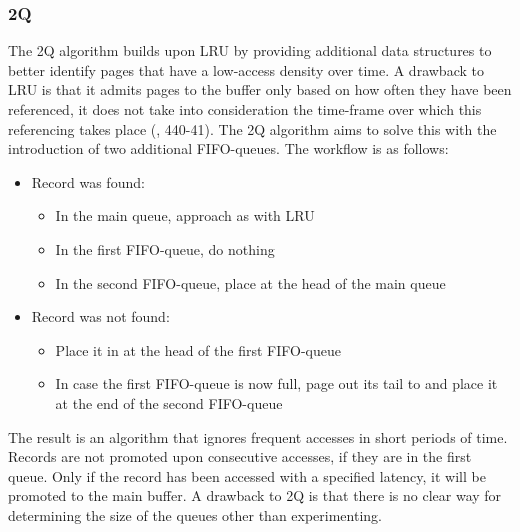 \documentclass[a4paper, twocolumn,11pt]{article}
\begin{document}
\subsubsection{2Q}
The 2Q algorithm builds upon LRU by providing additional data structures to better identify pages that have a low-access density over time. A drawback to LRU is that it admits pages to the buffer only based on how often they have been referenced, it does not take into consideration the time-frame over which this referencing takes place (\cite{Johnson}, 440-41). The 2Q algorithm aims to solve this with the introduction of two additional FIFO-queues. The workflow is as follows: 

\begin{itemize}
	\item Record was found:
	\begin{itemize}
		\item In the main queue, approach as with LRU
		\item In the first FIFO-queue, do nothing
		\item In the second FIFO-queue, place at the head of the main queue
	\end{itemize}
	\item Record was not found:
	\begin{itemize}
		\item Place it in at the head of the first FIFO-queue
		\item In case the first FIFO-queue is now full, page out its tail to and place it at the end of the second FIFO-queue
	\end{itemize}
\end{itemize}

The result is an algorithm that ignores frequent accesses in short periods of time. Records are not promoted upon consecutive accesses, if they are in the first queue. Only if the record has been accessed with a specified latency, it will be promoted to the main buffer. A drawback to 2Q is that there is no clear way for determining the size of the queues other than experimenting.
\end{document}
